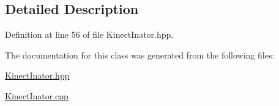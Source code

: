 \subsection{Detailed Description}


Definition at line 56 of file Kinect\-Inator.\-hpp.



The documentation for this class was generated from the following files\-:\begin{DoxyCompactItemize}
\item 
\hyperlink{_kinect_inator_8hpp}{Kinect\-Inator.\-hpp}\item 
\hyperlink{_kinect_inator_8cpp}{Kinect\-Inator.\-cpp}\end{DoxyCompactItemize}
